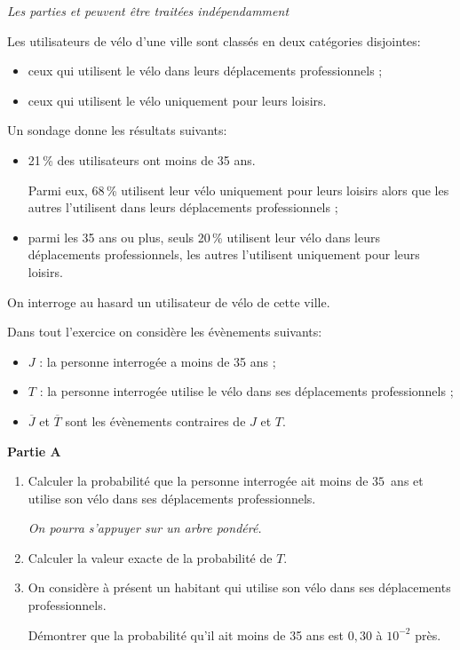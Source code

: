 \emph{Les parties  et  peuvent être traitées indépendamment}

\medskip

Les utilisateurs de vélo d'une ville sont classés en deux catégories disjointes:

\begin{itemize}
	\item ceux qui utilisent le vélo dans leurs déplacements professionnels ;
	\item ceux qui utilisent le vélo uniquement pour leurs loisirs.
\end{itemize}

Un sondage donne les résultats suivants:

\begin{itemize}
	\item 21\,\% des utilisateurs ont moins de 35 ans.
	
	Parmi eux, 68\,\% utilisent leur vélo uniquement pour leurs loisirs alors que les autres l'utilisent dans leurs déplacements professionnels ;
	\item parmi les 35 ans ou plus, seuls 20\,\% utilisent leur vélo dans leurs déplacements professionnels, les autres l'utilisent uniquement pour leurs loisirs.
\end{itemize}

On interroge au hasard un utilisateur de vélo de cette ville.

Dans tout l'exercice on considère les évènements suivants:

\begin{itemize}
	\item $J$ : \og la personne interrogée a moins de 35 ans \fg{} ;
	\item $T$ : \og la personne interrogée utilise le vélo dans ses déplacements professionnels \fg{} ;
	\item $\overline{J}$ et $\overline{T}$ sont les évènements contraires de $J$ et $T$.
\end{itemize}

\textbf{Partie A}

\smallskip

\begin{enumerate}
	\item Calculer la probabilité que la personne interrogée ait moins de $35$~ans et utilise son vélo dans ses déplacements professionnels.
	
	\emph{On pourra s'appuyer sur un arbre pondéré.}
	\item Calculer la valeur exacte de la probabilité de $T$.
	\item On considère à présent un habitant qui utilise son vélo dans ses déplacements professionnels.
	
	Démontrer que la probabilité qu'il ait moins de 35 ans est $0,30$ à $10^{-2}$ près.
\end{enumerate}

